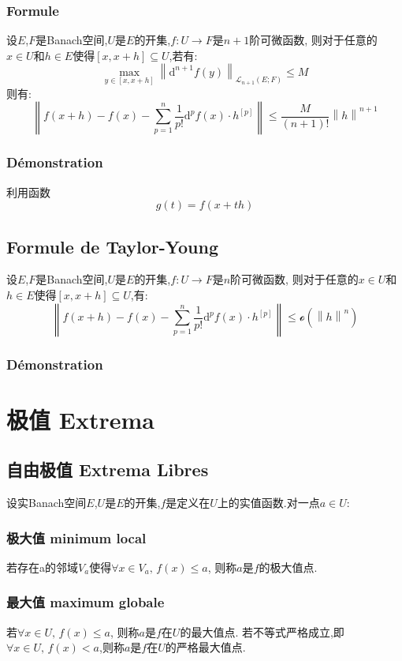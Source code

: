 \documentclass[12pt, a4paper, oneside]{ctexbook}
\newcommand{\di }{\text{d}}%
\begin{document}
  \subsubsection{Formule}
  设$E$,$F$是Banach空间,$U$是$E$的开集,$f:U\rightarrow F$是${n+1}$阶可微函数,
  则对于任意的$x\in U$和$h\in E$使得$[x,x+h]\subseteq U$,若有:
  $$
  \max_{y\in[x,x+h]} \left\lVert \di^{n+1}f(y)\right\rVert _{\mathcal{L}_{n+1}(E;F)}\leq M
  $$
  则有:
  $$
  \left\lVert f(x+h)-f(x)-\sum_{p=1}^{n}\frac{1}{p!}\di^pf(x)\cdot h^{[p]}\right\rVert \leq \frac{M}{(n+1)!}\left\lVert h\right\rVert ^{n+1}
  $$
  \subsubsection{Démonstration}
  利用函数
  $$
  g(t)=f(x+th)
  $$
  \subsection{Formule de Taylor-Young}
  设$E$,$F$是Banach空间,$U$是$E$的开集,$f:U\rightarrow F$是$n$阶可微函数,
  则对于任意的$x\in U$和$h\in E$使得$[x,x+h]\subseteq U$,有:
  $$
  \left\lVert f(x+h)-f(x)-\sum_{p=1}^{n}\frac{1}{p!}\di^pf(x)\cdot h^{[p]}\right\rVert \leq 
  \mathcal{o}(\left\lVert h\right\rVert ^n)
  $$
  \subsubsection{Démonstration}

\section{极值 Extrema}
  \subsection{自由极值 Extrema Libres}
  设实Banach空间$E$,$U$是$E$的开集,$f$是定义在$U$上的实值函数.对一点$a\in U$:
  \subsubsection{极大值 minimum local}
  若存在a的邻域$V_a$使得$\forall x\in V_a,\,f(x)\leq a$,
  则称$a$是$f$的极大值点.
  \subsubsection{最大值 maximum globale}
  若$\forall x\in U,\,f(x)\leq a$,
  则称$a$是$f$在$U$的最大值点.
  若不等式严格成立,即$\forall x\in U,\,f(x)< a$,则称$a$是$f$在$U$的严格最大值点.
\end{document}
